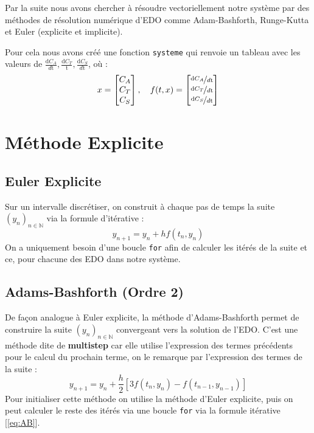 \documentclass[12pt]{article}
\theoremstyle{saav}
\newcommand{\rect}[1]{\left[ #1 \right]}
\newcommand{\mb}[1]{\mathbb{#1}}
\begin{document}
	
	
	Par la suite nous avons chercher à résoudre vectoriellement notre système par des méthodes de résolution numérique d'EDO comme Adam-Bashforth, Runge-Kutta et Euler (explicite et implicite).
	
	Pour cela nous avons créé une fonction \texttt{systeme} qui renvoie un tableau avec les valeurs de $\frac{\mathrm{d}C_{A}}{d\mathrm{t}}, \frac{\mathrm{d}C_{T}}{\mathrm{t}},\frac{\mathrm{d}C_{S}}{d\mathrm{t}}$, où : 
	\begin{equation*}
		x = \begin{bmatrix}
			C_{A}\\
			C_{T}\\
			C_{S}
		\end{bmatrix} , 
		\quad
		 f(t,x) = \begin{bmatrix}
		\nicefrac{\mathrm{d}C_{A}}{d\mathrm{t}}\\
		\nicefrac{\mathrm{d}C_{T}}{d\mathrm{t}}\\
		\nicefrac{\mathrm{d}C_{S}}{d\mathrm{t}}
		\end{bmatrix}
	\end{equation*}
	
	\section{Méthode Explicite}
		\subsection{Euler Explicite}
		Sur un intervalle discrétiser, on construit à chaque pas de temps la suite $(y_{n})_{n \in \mb{N}}$ via la formule d'itérative :
		\begin{equation}
			y_{n+1}=y_n+hf(t_n,y_n)
			\label{eq:euler_exp}
		\end{equation} 
		On a uniquement besoin d'une boucle \texttt{for} afin de calculer les itérés de la suite et ce, pour chacune des EDO dans notre système.
		
		
	

		\subsection{Adams-Bashforth (Ordre 2)}
			De façon analogue à Euler explicite, la méthode d'Adams-Bashforth permet de construire la suite $(y_{n})_{n \in \mb{N}}$ convergeant vers la solution de l'EDO. C'est une méthode dite de \textbf{multistep} car elle utilise l'expression des termes précédents pour le calcul du prochain terme, on le remarque par l'expression des termes de la suite : 
			\begin{equation}
				y_{n+1} = y_{n} + \frac{h}{2}\rect{3 f(t_{n},y_{n}) - f(t_{n-1}, y_{n-1})}\label{eq:AB}
			\end{equation}
			Pour initialiser cette méthode on utilise la méthode d'Euler explicite, puis on peut calculer le reste des itérés via une boucle \texttt{for} via la formule itérative [\ref{eq:AB}].
\end{document}

